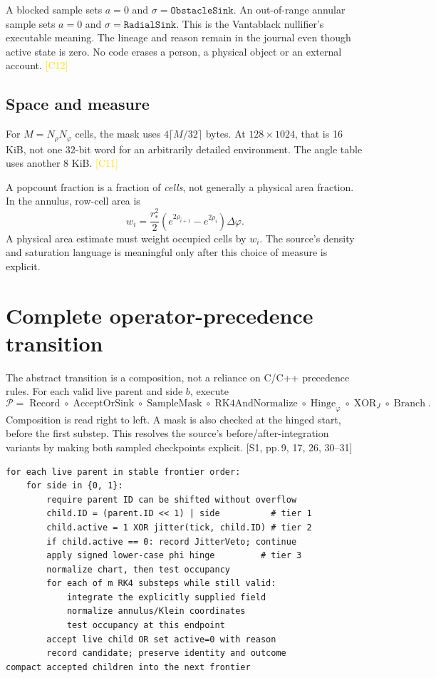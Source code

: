\documentclass[11pt,a4paper]{article}
\newcommand{\src}[2]{\textcolor{muted}{[#1, #2]}}
\newcommand{\corr}[1]{\textcolor{gold}{\textsf{[#1]}}}
\newcommand{\ph}{\varphi}
\begin{document}
A blocked sample sets $a=0$ and $\sigma=\texttt{ObstacleSink}$. An out-of-range annular sample sets $a=0$ and $\sigma=\texttt{RadialSink}$. This is the Vantablack nullifier's executable meaning. The lineage and reason remain in the journal even though active state is zero. No code erases a person, a physical object or an external account. \corr{C12}

\subsection{Space and measure}
For $M=N_\rho N_\ph$ cells, the mask uses $4\lceil M/32\rceil$ bytes. At $128\times1024$, that is 16 KiB, not one 32-bit word for an arbitrarily detailed environment. The angle table uses another 8 KiB. \corr{C11}

A popcount fraction is a fraction of \emph{cells}, not generally a physical area fraction. In the annulus, row-cell area is
\begin{equation}
 w_i=\frac{r_*^2}{2}\left(e^{2\rho_{i+1}}-e^{2\rho_i}\right)\Delta\ph.
\end{equation}
A physical area estimate must weight occupied cells by $w_i$. The source's density and saturation language is meaningful only after this choice of measure is explicit.
\clearpage

\section{Complete operator-precedence transition}
The abstract transition is a composition, not a reliance on C/C++ precedence rules. For each valid live parent and side $b$, execute
\begin{equation}
 \mathcal P=
 \operatorname{Record}\circ\operatorname{AcceptOrSink}\circ
 \operatorname{SampleMask}\circ\operatorname{RK4AndNormalize}\circ
 \operatorname{Hinge}_\ph\circ\operatorname{XOR}_J\circ\operatorname{Branch}.
\end{equation}
Composition is read right to left. A mask is also checked at the hinged start, before the first substep. This resolves the source's before/after-integration variants by making both sampled checkpoints explicit. \src{S1}{pp.\,9, 17, 26, 30--31}

\begin{lstlisting}
for each live parent in stable frontier order:
    for side in {0, 1}:
        require parent ID can be shifted without overflow
        child.ID = (parent.ID << 1) | side          # tier 1
        child.active = 1 XOR jitter(tick, child.ID) # tier 2
        if child.active == 0: record JitterVeto; continue
        apply signed lower-case phi hinge         # tier 3
        normalize chart, then test occupancy
        for each of m RK4 substeps while still valid:
            integrate the explicitly supplied field
            normalize annulus/Klein coordinates
            test occupancy at this endpoint
        accept live child OR set active=0 with reason
        record candidate; preserve identity and outcome
compact accepted children into the next frontier
\end{lstlisting}
\end{document}
